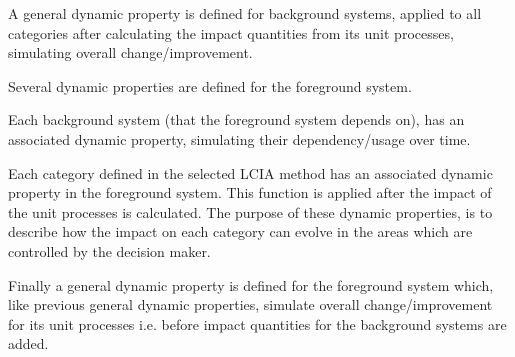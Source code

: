A general dynamic property is defined for background systems, applied to all categories after calculating the impact quantities from its unit processes, simulating overall change/improvement.

Several dynamic properties are defined for the foreground system. 

Each background system (that the foreground system depends on), has an associated dynamic property, simulating their dependency/usage over time.

Each category defined in the selected LCIA method has an associated dynamic property in the foreground system. This function is applied after the impact of the unit processes is calculated. The purpose of these dynamic properties, is to describe how the impact on each category can evolve in the areas which are controlled by the decision maker. 

Finally a general dynamic property is defined for the foreground system which, like previous general dynamic properties, simulate overall change/improvement for its unit processes i.e. before impact quantities for the background systems are added.